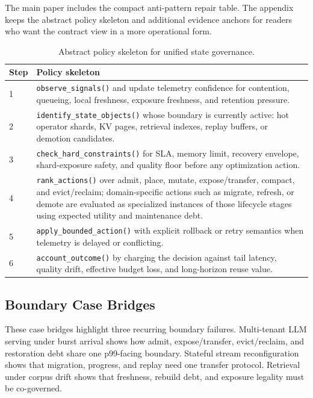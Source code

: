 The main paper includes the compact anti-pattern repair table. The appendix keeps the abstract policy skeleton and additional evidence anchors for readers who want the contract view in a more operational form.

\begin{table}[t]
\small
\caption{Abstract policy skeleton for unified state governance.}
\label{tab:supp-policy-skeleton}
\begin{tabular}{@{}p{}p{}@{}}
\toprule
Step & Policy skeleton \\
\midrule
1 & \texttt{observe\_signals()} and update telemetry confidence for contention, queueing, local freshness, exposure freshness, and retention pressure. \\
2 & \texttt{identify\_state\_objects()} whose boundary is currently active: hot operator shards, KV pages, retrieval indexes, replay buffers, or demotion candidates. \\
3 & \texttt{check\_hard\_constraints()} for SLA, memory limit, recovery envelope, shard-exposure safety, and quality floor before any optimization action. \\
4 & \texttt{rank\_actions()} over admit, place, mutate, expose/transfer, compact, and evict/reclaim; domain-specific actions such as migrate, refresh, or demote are evaluated as specialized instances of those lifecycle stages using expected utility and maintenance debt. \\
5 & \texttt{apply\_bounded\_action()} with explicit rollback or retry semantics when telemetry is delayed or conflicting. \\
6 & \texttt{account\_outcome()} by charging the decision against tail latency, quality drift, effective budget loss, and long-horizon reuse value. \\
\bottomrule
\end{tabular}
\end{table}

\subsection{Boundary Case Bridges}

These case bridges highlight three recurring boundary failures. Multi-tenant LLM serving under burst arrival shows how admit, expose/transfer, evict/reclaim, and restoration debt share one p99-facing boundary. Stateful stream reconfiguration shows that migration, progress, and replay need one transfer protocol. Retrieval under corpus drift shows that freshness, rebuild debt, and exposure legality must be co-governed.

